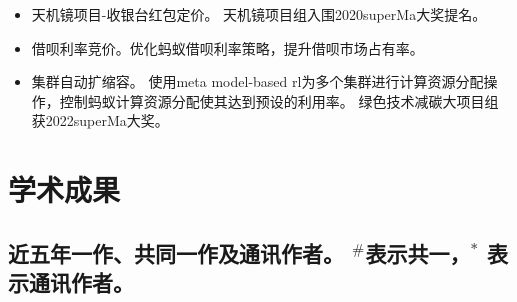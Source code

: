 \documentclass{resume}
\begin{document}
\begin{itemize}[parsep=0.5ex]
  \item 天机镜项目-收银台红包定价。 天机镜项目组入围2020superMa大奖提名。
  \item 借呗利率竞价。优化蚂蚁借呗利率策略，提升借呗市场占有率。
  \item 集群自动扩缩容。 使用meta model-based rl为多个集群进行计算资源分配操作，控制蚂蚁计算资源分配使其达到预设的利用率。   绿色技术减碳大项目组获2022superMa大奖。
\end{itemize}


\section{学术成果}
\subsection{近五年一作、共同一作及通讯作者。 $^\#$表示共一，$^*$ 表示通讯作者。 }
\end{document}
